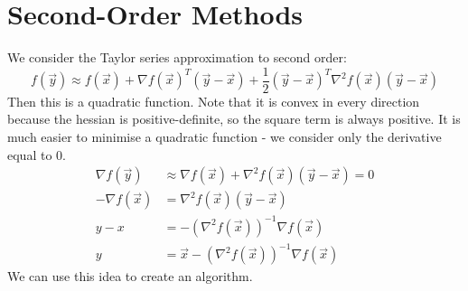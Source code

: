 \documentclass[../Main.tex]{subfiles}
\begin{document}
\section{Second-Order Methods}
We consider the Taylor series approximation to second order:
\begin{equation*}
    f(\vec{y}) \approx f(\vec{x}) + \nabla f(\vec{x})^T (\vec{y} - \vec{x}) + \frac{1}{2} (\vec{y} - \vec{x})^T \nabla^2 f(\vec{x}) (\vec{y} - \vec{x})
\end{equation*}
Then this is a quadratic function. Note that it is convex in every direction because the hessian is positive-definite, so the square term is always positive. It is much easier to minimise a quadratic function - we consider only the derivative equal to 0.
\begin{align*}
    \nabla f(\vec{y}) &\approx \nabla f(\vec{x}) + \nabla^2 f(\vec{x}) (\vec{y} - \vec{x}) = 0 \\
    -\nabla f(\vec{x}) &= \nabla^2 f(\vec{x}) (\vec{y} - \vec{x}) \\
    y - x &= -\left(\nabla^2 f(\vec{x})\right)^{-1} \nabla f(\vec{x}) \\
    y &= \vec{x} - \left(\nabla^2 f(\vec{x})\right)^{-1} \nabla f(\vec{x})
\end{align*}
We can use this idea to create an algorithm.
\end{document}
